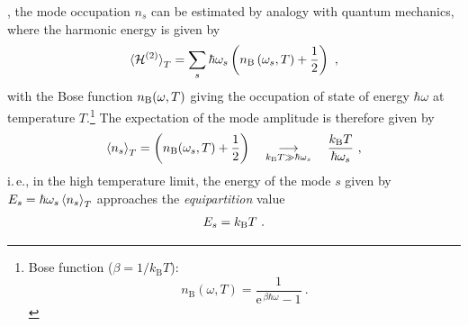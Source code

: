 , the mode occupation $n_s$ can be estimated
by analogy with quantum mechanics, where the harmonic energy is given by~\cite{Dove}
\begin{align}
	\braket{\mathcal H^{(2)}}_T
		=\sum_{s} \hbar \omega_{s}\left(n_{\mathrm{B}}\left(\omega_{s}, T\right)+\frac{1}{2}\right)~,
\end{align}
with the Bose function $n_{\rm B} (\omega, T)$ giving the occupation of state of energy $\hbar \omega$ at temperature $T$.\footnote{Bose function ($\beta = 1 / k_{\mathrm{B}} T$): $$n_{\mathrm{B}}(\omega, T)=\frac{1}{\mathrm{e}^{\, \beta \hbar \omega}-1}~.$$}
The expectation of the mode amplitude is therefore given by
\begin{align}
	\braket{n_s}_T
		= \left(n_{\mathrm{B}}(\omega_s, T)+\frac{1}{2}\right)
	\quad\underset{k_{\rm B} T \gg \hbar \omega_s}{\longrightarrow}\quad
	\frac{k_{\rm B} T}{\hbar \omega_s}~,
	\label{eq:ha.amplitude.expectation}
\end{align}
i.\,e., in the high temperature limit, the energy of the mode $s$ given by \mbox{$E_s = \hbar \omega_s \braket{n_s}_T$} approaches the \emph{equipartition} value
\begin{align}
	E_s = k_{\rm B} T~.
	\label{eq:E.equipartition}
\end{align}

